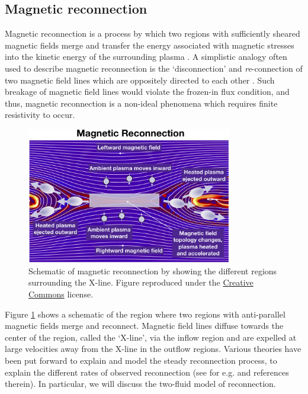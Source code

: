 \subsection{Magnetic reconnection}
Magnetic reconnection is a process by which two regions with sufficiently sheared magnetic fields merge and transfer the energy associated with magnetic stresses into the kinetic energy of the surrounding plasma \cite{Priest2000MagneticReconnection,Yamada2010MagneticReconnection}. A simplistic analogy often used to describe magnetic reconnection is the `disconnection' and \emph{re}-connection of two magnetic field lines which are oppositely directed to each other \cite{Gonzalez2016FundamentalReconnection}. Such breakage of magnetic field lines would violate the frozen-in flux condition, and thus, magnetic reconnection is a non-ideal phenomena which requires finite resistivity to occur. 

\begin{figure}
    \centering
    \includegraphics[width=0.8\textwidth]{images1/magnetic-reconnection-cartoon.png}
    \caption{Schematic of magnetic reconnection by \protect{} showing the different regions surrounding the X-line. Figure reproduced under the \protect\hyperlink{https://creativecommons.org/licenses/by-nc-nd/4.0}{Creative Commons} license.}
    \label{fig:chp1-reconnection-cartoon}
\end{figure}

Figure \ref{fig:chp1-reconnection-cartoon} shows a schematic of the region where two regions with anti-parallel magnetic fields merge and reconnect. Magnetic field lines diffuse towards the center of the region, called the `X-line', via the inflow region and are expelled at large velocities away from the X-line in the outflow regions. Various theories have been put forward to explain and model the steady reconnection process, to explain the different rates of observed reconnection (see for e.g.  and references therein). In particular, we will discuss the two-fluid model of reconnection. 

